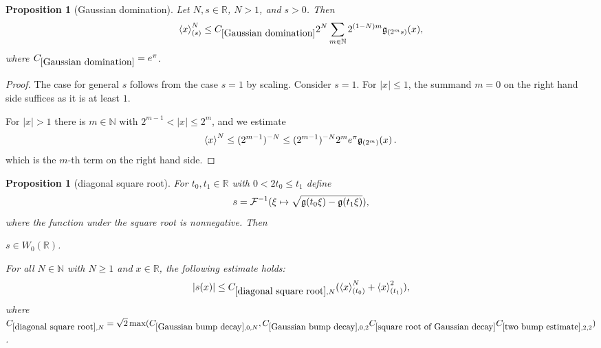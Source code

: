 \documentclass[12pt,reqno]{amsart}
\theoremstyle{plain}
\newtheorem{proposition}[theorem]{Proposition}
\numberwithin{equation}{section}
\theoremstyle{remark}
\newcommand{\using}[1]{}
\newcommand{\R}{{\mathbb R}}
\newcommand{\N}{{\mathbb N}}
\begin{document}
\begin{proposition}[Gaussian domination]\label{Gaussian domination}
    Let
    $N,s\in\R$, $N>1$, and $s>0$. Then
\begin{equation}\label{auto:bracket-Gaussian-domination}
    \left< x\right>^{N}_{(s)}  \le C_{\ref{Gaussian domination}} 2^N   \sum_{m\in {\N}}  2^{(1-N)m} \g_{(2^ms)}(x),
\end{equation}
where $C_{\ref{Gaussian domination}}=e^\pi$.
\end{proposition}
 \begin{proof}
     The case for general $s$ follows from the case $s=1$ by scaling.  Consider $s=1$. For $|x|\le 1$, the summand $m=0$ on the right hand side suffices as it is at least $1$.

     For $|x|>1$ there is $m\in \N$ with $2^{m-1}<|x|\le 2^{m}$, and we estimate
     \begin{equation}
          \left< x\right>^{N}\le (2^{m-1})^{-N} \le (2^{m-1})^{-N} 2^me^\pi \mathfrak{g}_{(2^m)}(x)\, . \,
     \end{equation}
     which is the $m$-th term on the right hand side.
 \end{proof}


\begin{proposition}[diagonal square root]\label{diagonal square root}\using{square root of Gaussian decay}\using{Gaussian bump decay}\using{two bump estimate}
For $t_0,t_1\in\R$ with $0<2t_0\le t_1$ define
\begin{equation}\label{auto:diagonal-square-root-definition} s = \mathcal{F}^{-1}(\xi\mapsto \sqrt{\mathfrak{g}(t_0 \xi)- \mathfrak{g}(t_1 \xi)}), \end{equation}
where the function under the square root is nonnegative. Then

$s\in W_0(\R)$.


For all $N\in \mathbb N$ with $N\geq 1$ and $x\in \R$, the following estimate holds:
\begin{equation}\label{E:s-estimate}
    |s(x)|\le  C_{\ref{diagonal square root},N} ( \left<x\right>^N_{(t_0)}+ \left<x\right>^2_{(t_1)}),
\end{equation}
where
$C_{\ref{diagonal square root},N}=\sqrt{2}\max(C_{\ref{Gaussian bump decay},0,N}, C_{\ref{Gaussian bump decay},0,2}C_{\ref{square root of Gaussian decay}}C_{\ref{two bump estimate},2,2})$.

\end{proposition}
\end{document}
